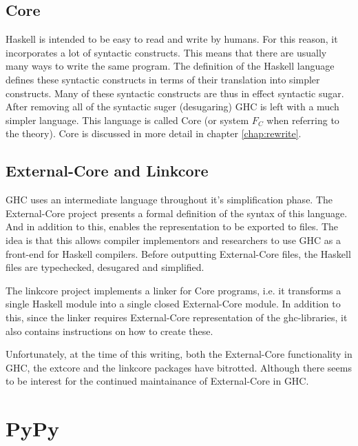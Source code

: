 \subsection*{Core}

Haskell is intended to be easy to read and write by humans. For this reason, it
incorporates a lot of syntactic constructs. This means that there are
usually many ways to write the same program. The definition of the Haskell language
defines these syntactic constructs in terms of their translation into simpler
constructs. Many of these syntactic constructs are thus in effect syntactic sugar.
After removing all of the syntactic suger (desugaring) GHC is left with a much 
simpler language. This language is called Core (or system $F_C$ when referring to
the theory).\cite{marlow2012glasgow} Core is discussed in more detail in chapter 
\ref{chap:rewrite}.

\subsection*{External-Core and Linkcore}

GHC uses an intermediate language throughout it's 
simplification phase. The External-Core project presents a formal definition of the syntax 
of this language. And in addition to this, enables the representation to be exported 
to files. The idea is that this allows compiler implementors and researchers to use GHC
as a front-end for Haskell compilers. Before outputting External-Core files,
the Haskell files are typechecked, desugared and simplified. \cite{tolmach2010ghc}

The linkcore project implements a linker for Core programs, i.e. it transforms
a single Haskell module into a single closed External-Core module. In addition to
this, since the linker requires External-Core representation of the ghc-libraries,
it also contains instructions on how to create these. 

Unfortunately, at the time of this writing, both the External-Core functionality in
GHC, the extcore and the linkcore 
packages have bitrotted. Although there seems to be interest for the continued 
maintainance of External-Core in GHC.


\section{PyPy}


